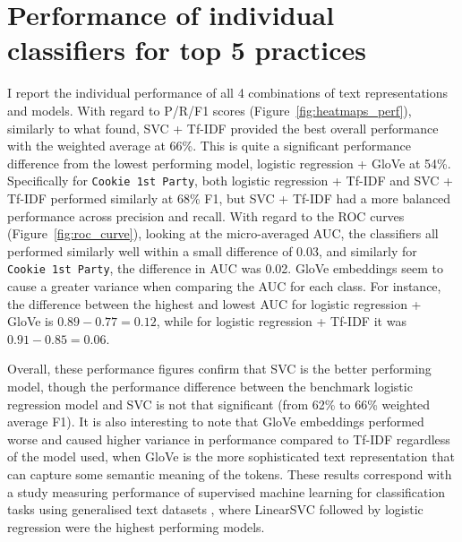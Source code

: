 \section{Performance of individual classifiers for top 5 practices}
I report the individual performance of all 4 combinations of text representations and models. With regard to P/R/F1 scores (Figure~\ref{fig:heatmaps_perf}), similarly to what \cite{zimmeck2019} found, SVC + Tf-IDF provided the best overall performance with the weighted average at 66\%. This is quite a significant performance difference from the lowest performing model, logistic regression + GloVe at 54\%. Specifically for \texttt{Cookie 1st Party}, both logistic regression + Tf-IDF and SVC + Tf-IDF performed similarly at 68\% F1, but SVC + Tf-IDF had a more balanced performance across precision and recall. With regard to the ROC curves (Figure~\ref{fig:roc_curve}), looking at the micro-averaged AUC, the classifiers all performed similarly well within a small difference of 0.03, and similarly for \texttt{Cookie 1st Party}, the difference in AUC was 0.02. GloVe embeddings seem to cause a greater variance when comparing the AUC for each class. For instance, the difference between the highest and lowest AUC for logistic regression + GloVe is $0.89 - 0.77 = 0.12$, while for logistic regression + Tf-IDF it was $0.91 - 0.85 = 0.06$.

Overall, these performance figures confirm that SVC is the better performing model, though the performance difference between the benchmark logistic regression model and SVC is not that significant (from 62\% to 66\% weighted average F1). It is also interesting to note that GloVe embeddings performed worse and caused higher variance in performance compared to Tf-IDF regardless of the model used, when GloVe is the more sophisticated text representation that can capture some semantic meaning of the tokens. These results correspond with a study measuring performance of supervised machine learning for classification tasks using generalised text datasets \cite{hsu2020}, where LinearSVC followed by logistic regression were the highest performing models.


